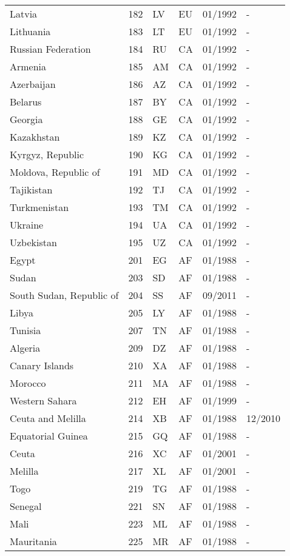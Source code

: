 \begin{small}
\begin{longtable}{p{4.3cm}p{1.5cm}p{1.5cm}p{1cm}p{2cm}p{2cm}}
Latvia	&	182	&	LV	&	EU	&	01/1992	&	-	\\
Lithuania	&	183	&	LT	&	EU	&	01/1992	&	-	\\
Russian Federation	&	184	&	RU	&	CA	&	01/1992	&	-	\\
Armenia	&	185	&	AM	&	CA	&	01/1992	&	-	\\
Azerbaijan	&	186	&	AZ	&	CA	&	01/1992	&	-	\\
Belarus	&	187	&	BY	&	CA	&	01/1992	&	-	\\
Georgia	&	188	&	GE	&	CA	&	01/1992	&	-	\\
Kazakhstan	&	189	&	KZ	&	CA	&	01/1992	&	-	\\
Kyrgyz, Republic	&	190	&	KG	&	CA	&	01/1992	&	-	\\
Moldova, Republic of	&	191	&	MD	&	CA	&	01/1992	&	-	\\
Tajikistan	&	192	&	TJ	&	CA	&	01/1992	&	-	\\
Turkmenistan	&	193	&	TM	&	CA	&	01/1992	&	-	\\
Ukraine	&	194	&	UA	&	CA	&	01/1992	&	-	\\
Uzbekistan	&	195	&	UZ	&	CA	&	01/1992	&	-	\\
Egypt	&	201	&	EG	&	AF	&	01/1988	&	-	\\
Sudan	&	203	&	SD	&	AF	&	01/1988	&	-	\\
South Sudan, Republic of	&	204	&	SS	&	AF	&	09/2011	&	-	\\
Libya	&	205	&	LY	&	AF	&	01/1988	&	-	\\
Tunisia	&	207	&	TN	&	AF	&	01/1988	&	-	\\
Algeria	&	209	&	DZ	&	AF	&	01/1988	&	-	\\
Canary Islands	&	210	&	XA	&	AF	&	01/1988	&	-	\\
Morocco	&	211	&	MA	&	AF	&	01/1988	&	-	\\
Western Sahara	&	212	&	EH	&	AF	&	01/1999	&	-	\\
Ceuta and Melilla	&	214	&	XB	&	AF	&	01/1988	&	12/2010	\\
Equatorial Guinea	&	215	&	GQ	&	AF	&	01/1988	&	-	\\
Ceuta	&	216	&	XC	&	AF	&	01/2001	&	-	\\
Melilla	&	217	&	XL	&	AF	&	01/2001	&	-	\\
Togo	&	219	&	TG	&	AF	&	01/1988	&	-	\\
Senegal	&	221	&	SN	&	AF	&	01/1988	&	-	\\
Mali	&	223	&	ML	&	AF	&	01/1988	&	-	\\
Mauritania	&	225	&	MR	&	AF	&	01/1988	&	-	\\

\end{longtable}
\end{small}

